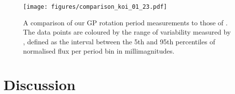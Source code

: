 \documentclass[a4paper,fleqn,usenatbib,useAMS]{mnras}
\newcommand{\Kepler}{{\it Kepler}}
\begin{document}

\begin{figure}
\begin{center}
\texttt{[image: figures/comparison\_koi\_01\_23.pdf]}
\caption[Comparison with McQuillan results.]
{A comparison of our GP rotation period measurements to those of
\citet{Mcquillan2013}.
The data points are coloured by the range of variability measured by
    \citet{Mcquillan2013}, defined as the interval between the 5th and 95th
    percentiles of normalised flux per period bin in millimagnitudes.}
\label{fig:mcquillan}
\end{center}
\end{figure}

\section{Discussion}
\label{sec:discussion}
\end{document}
